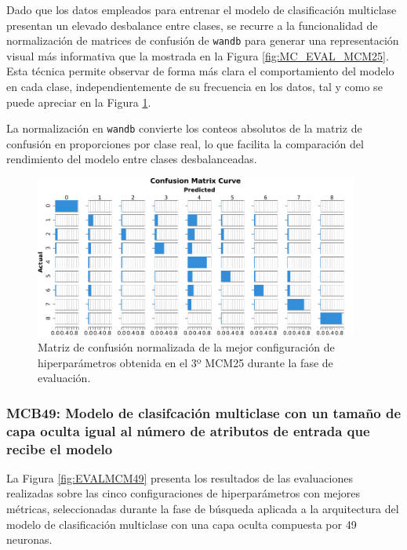 Dado que los datos empleados para entrenar el modelo de clasificación multiclase presentan un elevado desbalance entre clases, se recurre a la funcionalidad de normalización de matrices de confusión de \texttt{wandb} para generar una representación visual más informativa que la mostrada en la Figura \ref{fig:MC_EVAL_MCM25}. Esta técnica permite observar de forma más clara el comportamiento del modelo en cada clase, independientemente de su frecuencia en los datos, tal y como se puede apreciar en la Figura \ref{fig:MCNorm_EVAL_MCM25}.

La normalización en \texttt{wandb} convierte los conteos absolutos de la matriz de confusión en proporciones por clase real, lo que facilita la comparación del rendimiento del modelo entre clases desbalanceadas.

\begin{figure}[H]
    \centering
    \includegraphics[width=0.95\textwidth]{./img/evaluacion/matrices_confusion/MCNorm_EVAL_MCM25.pdf}
    \caption{Matriz de confusión normalizada de la mejor configuración de hiperparámetros obtenida en el 3º MCM25 durante la fase de evaluación.}
    \label{fig:MCNorm_EVAL_MCM25}
\end{figure}



\subsubsection{MCB49: Modelo de clasifcación multiclase con un tamaño de capa oculta igual al número de atributos de entrada que recibe el modelo}
La Figura \ref{fig:EVALMCM49} presenta los resultados de las evaluaciones realizadas sobre las cinco configuraciones de hiperparámetros con mejores métricas, seleccionadas durante la fase de búsqueda aplicada a la arquitectura del modelo de clasificación multiclase con una capa oculta compuesta por 49 neuronas.

